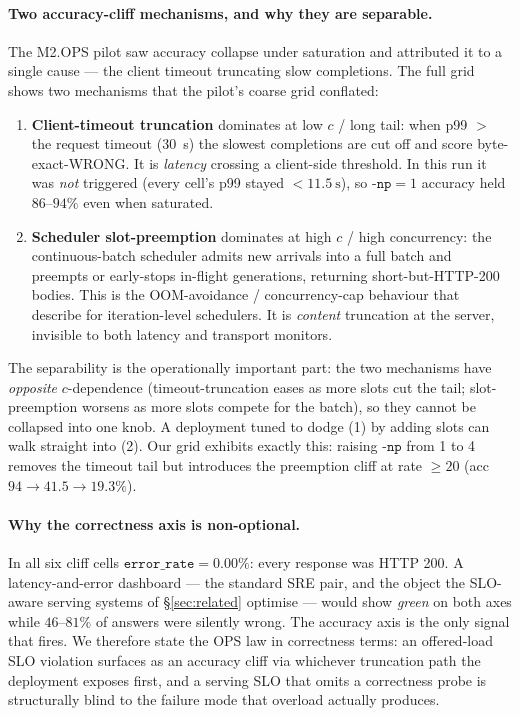 \documentclass[11pt,a4paper]{article}
\begin{document}
\paragraph{Two accuracy-cliff mechanisms, and why they are separable.} The
M2.OPS pilot saw accuracy collapse under saturation and attributed it to a
single cause --- the client timeout truncating slow completions. The full grid
shows two mechanisms that the pilot's coarse grid conflated:
\begin{enumerate}
  \item \textbf{Client-timeout truncation} dominates at low \(c\) / long tail:
    when p99 \(>\) the request timeout (\SI{30}{\second}) the slowest
    completions are cut off and score byte-exact-WRONG. It is \emph{latency}
    crossing a client-side threshold. In this run it was \emph{not} triggered
    (every cell's p99 stayed \(<\SI{11.5}{\second}\)), so \(\texttt{-np}{=}1\)
    accuracy held \(86\text{--}94\%\) even when saturated.
  \item \textbf{Scheduler slot-preemption} dominates at high \(c\) / high
    concurrency: the continuous-batch scheduler admits new arrivals into a full
    batch and preempts or early-stops in-flight generations, returning
    short-but-HTTP-200 bodies. This is the OOM-avoidance / concurrency-cap
    behaviour that \citet{cheng2024scls} describe for iteration-level
    schedulers. It is \emph{content} truncation at the server, invisible to both
    latency and transport monitors.
\end{enumerate}
The separability is the operationally important part: the two mechanisms have
\emph{opposite} \(c\)-dependence (timeout-truncation eases as more slots cut the
tail; slot-preemption worsens as more slots compete for the batch), so they
cannot be collapsed into one knob. A deployment tuned to dodge (1) by adding
slots can walk straight into (2). Our grid exhibits exactly this: raising
\(\texttt{-np}\) from 1 to 4 removes the timeout tail but introduces the
preemption cliff at rate \(\ge20\) (acc \(94\to41.5\to19.3\%\)).

\paragraph{Why the correctness axis is non-optional.} In all six cliff cells
\(\texttt{error\_rate}=0.00\%\): every response was HTTP 200. A latency-and-error
dashboard --- the standard SRE pair, and the object the SLO-aware serving systems
of \S\ref{sec:related} optimise --- would show \emph{green} on both axes while
\(46\text{--}81\%\) of answers were silently wrong. The accuracy axis is the only
signal that fires. We therefore state the OPS law in correctness terms: an
offered-load SLO violation surfaces as an accuracy cliff via whichever truncation
path the deployment exposes first, and a serving SLO that omits a correctness
probe is structurally blind to the failure mode that overload actually produces.
\end{document}
